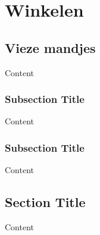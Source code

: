
\chapter{Winkelen} %

\label{ch:winkelen} %


\section{Vieze mandjes}


Content


\subsection{Subsection Title}

Content


\subsection{Subsection Title}

Content


\section{Section Title}

Content
